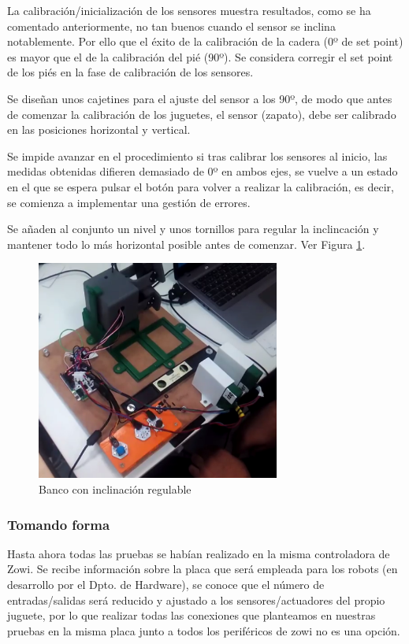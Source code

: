 La calibración/inicialización de los sensores muestra resultados, como se ha comentado anteriormente, no tan buenos cuando el sensor se inclina notablemente. Por ello que el éxito de la calibración de la cadera (0º de set point) es mayor que el de la calibración del pié (90º). Se considera corregir el set point de los piés en la fase de calibración de los sensores.

Se diseñan unos cajetines para el ajuste del sensor a los 90º, de modo que antes de comenzar la calibración de los juguetes, el sensor (zapato), debe ser calibrado en las posiciones horizontal y vertical.

Se impide avanzar en el procedimiento si tras calibrar los sensores al inicio, las medidas obtenidas difieren demasiado de 0º en ambos ejes, se vuelve a un estado en el que se espera pulsar el botón para volver a realizar la calibración, es decir, se comienza a implementar una gestión de errores.

Se añaden al conjunto un nivel y unos tornillos para regular la inclincación y mantener todo lo más horizontal posible antes de comenzar. Ver Figura \ref{fig:banconivel}.

\begin{figure}
\centering
\includegraphics[width=80mm]{Figures/banco_nivel}
\caption[Banco con inclinación regulable]{Banco con inclinación regulable}
\label{fig:banconivel}
\end{figure}

\subsubsection{Tomando forma}

Hasta ahora todas las pruebas se habían realizado en la misma controladora de Zowi. Se recibe información sobre la placa que será empleada para los robots (en desarrollo por el Dpto. de Hardware), se conoce que el número de entradas/salidas será reducido y ajustado a los sensores/actuadores del propio juguete, por lo que realizar todas las conexiones que planteamos en nuestras pruebas en la misma placa junto a todos los periféricos de zowi no es una opción.

